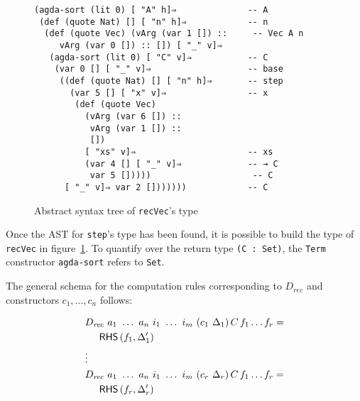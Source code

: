 \documentclass[runningheads]{llncs}
\begin{document}
\begin{figure}
\centering
\begingroup
\fontsize{7.9pt}{8pt}\selectfont
\begin{Verbatim}
(agda-sort (lit 0) [ "A" h]⇒              -- A
 (def (quote Nat) [] [ "n" h]⇒            -- n
  (def (quote Vec) (vArg (var 1 []) ::     -- Vec A n
     vArg (var 0 []) :: []) [ "_" v]⇒
   (agda-sort (lit 0) [ "C" v]⇒           -- C
    (var 0 [] [ "_" v]⇒                   -- base
     ((def (quote Nat) [] [ "n" h]⇒       -- step
       (var 5 [] [ "x" v]⇒                -- x
        (def (quote Vec)
          (vArg (var 6 []) ::         
           vArg (var 1 []) ::
           [])
          [ "xs" v]⇒                      -- xs
          (var 4 [] [ "_" v]⇒             -- → C
           var 5 []))))                    -- C
      [ "_" v]⇒ var 2 []))))))            -- C
\end{Verbatim}
\endgroup
\caption{Abstract syntax tree of \texttt{recVec}'s type}
\label{fig:ast-d}
\end{figure}


Once the AST for {\tt step}'s type has been found, it is possible to build the type of {\tt recVec} in figure~\ref{fig:ast-d}.
To quantify over the return type \texttt{(C : Set)}, the \texttt{Term} constructor \texttt{agda-sort} refers to \texttt{Set}. 

The general schema for the computation rules corresponding to $D_{\mathit{rec}}$ and constructors $c_1, \ldots, c_n$ follows:

\newcommand*{\RHSap}[2]{\ensuremath{\mathsf{RHS}\left(#1, #2\right)}}
\newcommand*{\RHS}[1]{\RHSap{f_{#1}}{\Delta_{#1}^\prime}}
\begin{center}
\fontsize{7.9pt}{2pt}\selectfont
\begin{align*}
& D_\mathit{rec}\ a_1\ \ldots\ a_n\ i_1\ \ldots\ i_m\ (c_1\ {\Delta_1}) \, C \, f_1 \ldots f_r = \\
&\hspace{0.5cm}\RHS{1}\\
& \vdots  \\
& D_\mathit{rec}\ a_1\ \ldots\ a_n\ i_1\ \ldots\ i_m\ (c_r\ {\Delta_r}) \, C \, f_1 \ldots f_r = \\
&\hspace{0.5cm}\RHS{r}\\ 
\end{align*}
\end{center}
\normalsize
\end{document}
